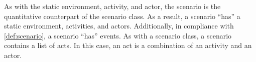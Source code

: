 As with the static environment, activity, and actor, the scenario is the quantitative counterpart of the scenario class. As a result, a scenario ``has'' a static environment, activities, and actors. Additionally, in compliance with \cref{def:scenario}, a scenario ``has'' events. As with a scenario class, a scenario contains a list of acts. In this case, an act is a combination of an activity and an actor.



